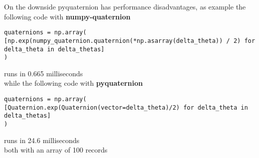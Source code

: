 On the downside pyquaternion has performance disadvantages, as example the following code with \textbf{numpy-quaternion}
\begin{lstlisting}
quaternions = np.array(
[np.exp(numpy_quaternion.quaternion(*np.asarray(delta_theta)) / 2) for delta_theta in delta_thetas]
)
\end{lstlisting}
runs in 0.665 milliseconds \\
while the following code with \textbf{pyquaternion} 
\begin{lstlisting}
quaternions = np.array(
[Quaternion.exp(Quaternion(vector=delta_theta)/2) for delta_theta in delta_thetas]
)
\end{lstlisting}
runs in 24.6 milliseconds \\
both with an array of 100 records